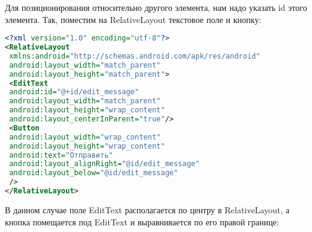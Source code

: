 Для позиционирования относительно другого элемента, нам надо указать id
этого элемента.
Так, поместим на RelativeLayout текстовое поле и кнопку:
\begin{lstlisting}[language=xml, caption=\leftline{xml}, label=lst:RelativeLayout1]
<?xml version="1.0" encoding="utf-8"?>
<RelativeLayout
 xmlns:android="http://schemas.android.com/apk/res/android"
 android:layout_width="match_parent"
 android:layout_height="match_parent">
 <EditText
 android:id="@+id/edit_message"
 android:layout_width="match_parent"
 android:layout_height="wrap_content"
 android:layout_centerInParent="true"/>
 <Button
 android:layout_width="wrap_content"
 android:layout_height="wrap_content"
 android:text="Отправить"
 android:layout_alignRight="@id/edit_message"
 android:layout_below="@id/edit_message"
 />
</RelativeLayout>
\end{lstlisting}
В данном случае поле EditText располагается по центру в RelativeLayout, а
кнопка помещается под EditText и выравнивается по его правой границе:
